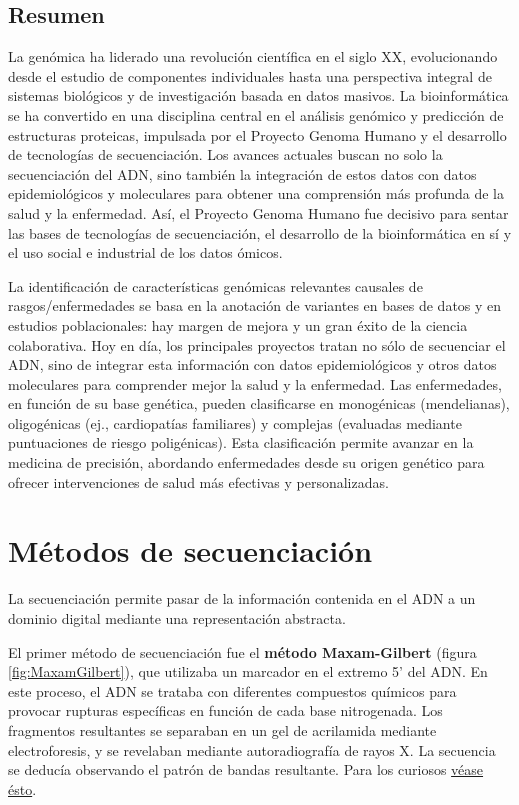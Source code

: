 \section{Resumen}
La genómica ha liderado una revolución científica en el siglo XX, evolucionando desde el estudio de componentes individuales hasta una perspectiva integral de sistemas biológicos y de investigación basada en datos masivos. La bioinformática se ha convertido en una disciplina central en el análisis genómico y predicción de estructuras proteicas, impulsada por el Proyecto Genoma Humano y el desarrollo de tecnologías de secuenciación. Los avances actuales buscan no solo la secuenciación del ADN, sino también la integración de estos datos con datos epidemiológicos y moleculares para obtener una comprensión más profunda de la salud y la enfermedad. Así, el Proyecto Genoma Humano fue decisivo para sentar las bases de tecnologías de secuenciación, el desarrollo de la bioinformática en sí y el uso social e industrial de los datos ómicos.

La identificación de características genómicas relevantes causales de rasgos/enfermedades se basa en la anotación de variantes en bases de datos y en estudios poblacionales: hay margen de mejora y un gran éxito de la ciencia colaborativa. Hoy en día, los principales proyectos tratan no sólo de secuenciar el ADN, sino de integrar esta información con datos epidemiológicos y otros datos moleculares para comprender mejor la salud y la enfermedad.
Las enfermedades, en función de su base genética, pueden clasificarse en monogénicas (mendelianas), oligogénicas (ej., cardiopatías familiares) y complejas (evaluadas mediante puntuaciones de riesgo poligénicas). Esta clasificación permite avanzar en la medicina de precisión, abordando enfermedades desde su origen genético para ofrecer intervenciones de salud más efectivas y personalizadas.

\chapter{Métodos de secuenciación}
La secuenciación permite pasar de la información contenida en el ADN a un dominio digital mediante una representación abstracta. 

El primer método de secuenciación fue el \textbf{método Maxam-Gilbert} (figura \ref{fig:MaxamGilbert}), que utilizaba un marcador en el extremo 5' del ADN. En este proceso, el ADN se trataba con diferentes compuestos químicos para provocar rupturas específicas en función de cada base nitrogenada. Los fragmentos resultantes se separaban en un gel de acrilamida mediante electroforesis, y se revelaban mediante autoradiografía de rayos X. La secuencia se deducía observando el patrón de bandas resultante. Para los curiosos \href{https://www.youtube.com/watch?v=_B5Dj8PL4E0}{véase ésto}.

